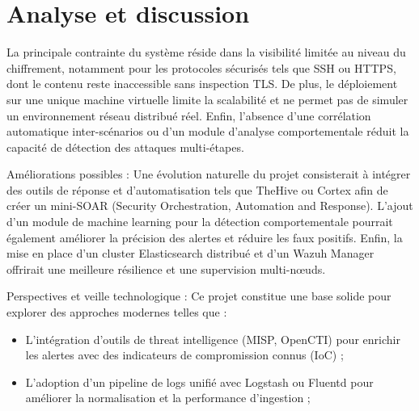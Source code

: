 \chapter{Analyse et discussion}
\label{chap:chap_4}

La principale contrainte du système réside dans la visibilité limitée au niveau du chiffrement, notamment pour les protocoles sécurisés tels que SSH ou HTTPS, dont le contenu reste inaccessible sans inspection TLS.  
De plus, le déploiement sur une unique machine virtuelle limite la scalabilité et ne permet pas de simuler un environnement réseau distribué réel.  
Enfin, l’absence d’une corrélation automatique inter-scénarios ou d’un module d’analyse comportementale réduit la capacité de détection des attaques multi-étapes.

\bigskip
\noindent
Améliorations possibles :  
Une évolution naturelle du projet consisterait à intégrer des outils de réponse et d’automatisation tels que TheHive ou Cortex afin de créer un mini-SOAR (Security Orchestration, Automation and Response).  
L’ajout d’un module de machine learning pour la détection comportementale pourrait également améliorer la précision des alertes et réduire les faux positifs.  
Enfin, la mise en place d’un cluster Elasticsearch distribué et d’un Wazuh Manager offrirait une meilleure résilience et une supervision multi-nœuds.

\bigskip
\noindent
Perspectives et veille technologique :  
Ce projet constitue une base solide pour explorer des approches modernes telles que :
\begin{itemize}
    \item L’intégration d’outils de threat intelligence (MISP, OpenCTI) pour enrichir les alertes avec des indicateurs de compromission connus (IoC) ;
    \item L’adoption d’un pipeline de logs unifié avec Logstash ou Fluentd pour améliorer la normalisation et la performance d’ingestion ;
\end{itemize}
